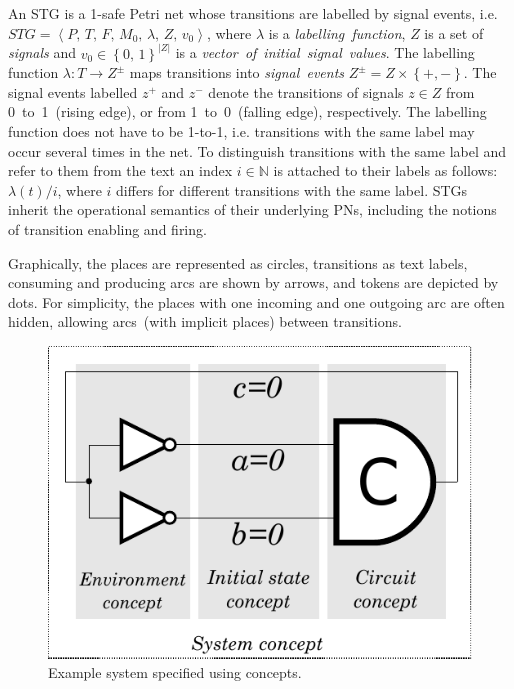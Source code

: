 \documentclass[british,compsoc]{IEEEtran}
\begin{document}
An STG is a 1-safe Petri net whose transitions are labelled by signal
events, i.e. $STG=\left\langle P,\, T,\, F,\, M_{0},\,\lambda,\, Z,\, v_{0}\right\rangle $,
where $\lambda$ is a \emph{labelling~function}, $Z$ is a set of
\emph{signals} and $v_{0}\in\left\{ 0,\,1\right\} ^{\left|Z\right|}$
is a \emph{vector~of}~\emph{initial~signal~values}. The labelling
function $\lambda:T\rightarrow Z^{\pm}$ maps transitions into \emph{signal~events}
$Z^{\pm}=Z\times\left\{ +,-\right\}$. The signal events labelled $z^{+}$
and $z^{-}$ denote the transitions of signals $z\in Z$ from 0~to~1~(rising
edge), or from 1~to~0~(falling edge), respectively. The labelling
function does not have to be 1-to-1, i.e. transitions with the same
label may occur several times in the net. To distinguish transitions
with the same label and refer to them from the text an index $i\in\mathbb{N}$
is attached to their labels as follows: $\lambda\left(t\right)/i$,
where $i$ differs for different transitions with the same label.
STGs inherit the operational semantics of their underlying PNs, including
the notions of transition enabling and firing.

Graphically, the places are represented as circles, transitions as
text labels, consuming and producing arcs are shown by arrows, and
tokens are depicted by dots. For simplicity, the places with one incoming
and one outgoing arc are often hidden, allowing arcs~(with implicit
places) between transitions.

\begin{figure}[t]
\begin{centering}
\includegraphics[scale=0.62]{Images/c-element-circuit-redo}
\par\end{centering}

\protect\caption{\label{fig:cElement-concepts}Example system specified using concepts.}
\end{figure}
\end{document}
